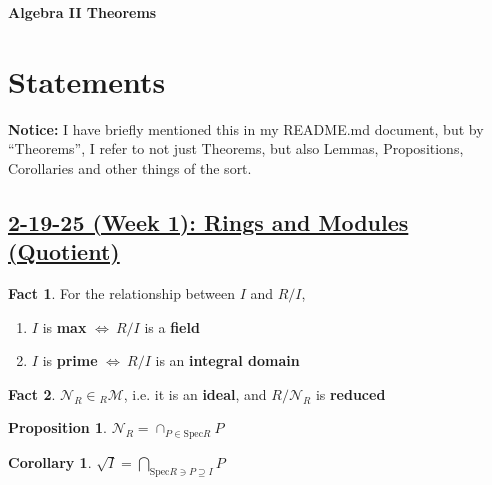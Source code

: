 \documentclass[12pt,a4paper]{article}
\theoremstyle{definition}
\newtheorem{proposition}{Proposition}
\newtheorem{corollary}{Corollary}
\newtheorem{fact}{Fact}
\begin{document}
\begin{center}
  {\Large \bf Algebra II Theorems}\\[6pt]
\end{center}

\section*{Statements}
\begin{mdframed}
\textbf{Notice:} I have briefly mentioned this in my README.md document, but by ``Theorems'', I refer to not just Theorems, but also Lemmas, Propositions, Corollaries and other things of the sort.
\end{mdframed}

\setcounter{subsection}{1}
\setcounter{theorem}{0}
\setcounter{lemma}{0}
\setcounter{proposition}{0}
\setcounter{corollary}{0}
\setcounter{fact}{0}
\setcounter{claim}{0}
\setcounter{example}{0}
\subsection*{\underline{\textbf{2-19-25 (Week 1): Rings and Modules (Quotient)}}}
\begin{tcolorbox}
\begin{fact}
  For the relationship between $I$ and $R/I$,
  \begin{enumerate} [(1)]
    \item $I$ is \textbf{max} $\Leftrightarrow \ R/I$ is a \textbf{field}
    \item $I$ is \textbf{prime} $\Leftrightarrow \ R/I$ is an \textbf{integral domain}
  \end{enumerate}
\end{fact}
\end{tcolorbox}
\vspace{0.125em}

\begin{fact}
  $\mathcal{N}_R \in \text{}_R \mathcal{M}$, i.e. it is an \textbf{ideal}, and \underline{$R/\mathcal{N}_R$} is \textbf{reduced}
\end{fact}
\vspace{0.125em}

\begin{proposition}
  $\boxed{\mathcal{N}_R = \cap_{P \in \text{Spec}R} P}$
\end{proposition}
\vspace{0.125em}

\begin{corollary}
  $\sqrt{I} = \bigcap_{\text{Spec}R \ni P \supseteq I} P$
\end{corollary}
\vspace{0.125em}
\end{document}
